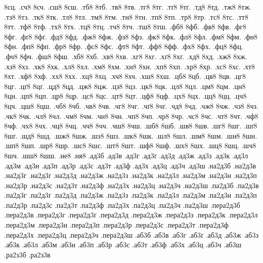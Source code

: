 {8сц.
.сч8
8сч.
.сш8
8сш.
.тб8
8тб.
.тв8
8тв.
.тг8
8тг.
.тґ8
8тґ.
.тд8
8тд.
.тж8
8тж.
.тз8
8тз.
.тк8
8тк.
.тл8
8тл.
.тм8
8тм.
.тн8
8тн.
.тп8
8тп.
.тр8
8тр.
.тс8
8тс.
.тт8
8тт.
.тф8
8тф.
.тх8
8тх.
.тц8
8тц.
.тч8
8тч.
.тш8
8тш.
.фб8
8фб.
.фв8
8фв.
.фг8
8фг.
.фґ8
8фґ.
.фд8
8фд.
.фж8
8фж.
.фз8
8фз.
.фк8
8фк.
.фл8
8фл.
.фм8
8фм.
.фн8
8фн.
.фп8
8фп.
.фр8
8фр.
.фс8
8фс.
.фт8
8фт.
.фф8
8фф.
.фх8
8фх.
.фц8
8фц.
.фч8
8фч.
.фш8
8фш.
.хб8
8хб.
.хв8
8хв.
.хг8
8хг.
.хґ8
8хґ.
.хд8
8хд.
.хж8
8хж.
.хз8
8хз.
.хк8
8хк.
.хл8
8хл.
.хм8
8хм.
.хн8
8хн.
.хп8
8хп.
.хр8
8хр.
.хс8
8хс.
.хт8
8хт.
.хф8
8хф.
.хх8
8хх.
.хц8
8хц.
.хч8
8хч.
.хш8
8хш.
.цб8
8цб.
.цв8
8цв.
.цг8
8цг.
.цґ8
8цґ.
.цд8
8цд.
.цж8
8цж.
.цз8
8цз.
.цк8
8цк.
.цл8
8цл.
.цм8
8цм.
.цн8
8цн.
.цп8
8цп.
.цр8
8цр.
.цс8
8цс.
.цт8
8цт.
.цф8
8цф.
.цх8
8цх.
.цц8
8цц.
.цч8
8цч.
.цш8
8цш.
.чб8
8чб.
.чв8
8чв.
.чг8
8чг.
.чґ8
8чґ.
.чд8
8чд.
.чж8
8чж.
.чз8
8чз.
.чк8
8чк.
.чл8
8чл.
.чм8
8чм.
.чн8
8чн.
.чп8
8чп.
.чр8
8чр.
.чс8
8чс.
.чт8
8чт.
.чф8
8чф.
.чх8
8чх.
.чц8
8чц.
.чч8
8чч.
.чш8
8чш.
.шб8
8шб.
.шв8
8шв.
.шг8
8шг.
.шґ8
8шґ.
.шд8
8шд.
.шж8
8шж.
.шз8
8шз.
.шк8
8шк.
.шл8
8шл.
.шм8
8шм.
.шн8
8шн.
.шп8
8шп.
.шр8
8шр.
.шс8
8шс.
.шт8
8шт.
.шф8
8шф.
.шх8
8шх.
.шц8
8шц.
.шч8
8шч.
.шш8
8шш.
%
%
%
.не8
.ня8
%
%
%
.ад3б
.ад3в
.ад3г
.ад3ґ
.ад3д
.ад3ж
.ад3з
.ад3к
.ад3л
.ад3м
.ад3н
.ад3п
.ад3р
.ад3с
.ад3т
.ад3ф
.ад3х
.ад3ц
.ад3ч
.ад3ш
.на2д3б
.на2д3в
.на2д3г
.на2д3ґ
.на2д3д
.на2д3ж
.на2д3з
.на2д3к
.на2д3л
.на2д3м
.на2д3н
.на2д3п
.на2д3р
.на2д3с
.на2д3т
.на2д3ф
.на2д3х
.на2д3ц
.на2д3ч
.на2д3ш
.па2д3б
.па2д3в
.па2д3г
.па2д3ґ
.па2д3д
.па2д3ж
.па2д3з
.па2д3к
.па2д3л
.па2д3м
.па2д3н
.па2д3п
.па2д3р
.па2д3с
.па2д3т
.па2д3ф
.па2д3х
.па2д3ц
.па2д3ч
.па2д3ш
.пера2д3б
.пера2д3в
.пера2д3г
.пера2д3ґ
.пера2д3д
.пера2д3ж
.пера2д3з
.пера2д3к
.пера2д3л
.пера2д3м
.пера2д3н
.пера2д3п
.пера2д3р
.пера2д3с
.пера2д3т
.пера2д3ф
.пера2д3х
.пера2д3ц
.пера2д3ч
.пера2д3ш
.аб3б
.аб3в
.аб3г
.аб3ґ
.аб3д
.аб3ж
.аб3з
.аб3к
.аб3л
.аб3м
.аб3н
.аб3п
.аб3р
.аб3с
.аб3т
.аб3ф
.аб3х
.аб3ц
.аб3ч
.аб3ш
.ра2з3б
.ра2з3в
}
